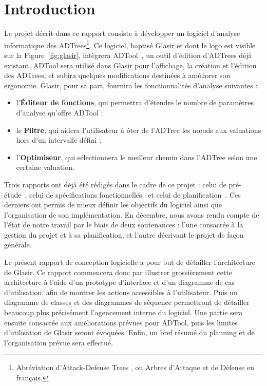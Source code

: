 \section{Introduction}
    \label{sec:intro}

    Le projet décrit dans ce rapport consiste à développer un logiciel d'analyse informatique des ADTrees\footnote{Abréviation d'\og Attack-Defense Trees \fg{}, ou \og Arbres d'Attaque et de Défense\fg{} en français.}. Ce logiciel, baptisé Glasir et dont le logo est visible sur la {\sc Figure}~\ref{fig:glasir}, intègrera ADTool~\cite{ADTool}, un outil d'édition d'ADTrees déjà existant. ADTool sera utilisé dans Glasir pour l'affichage, la création et l'édition des ADTrees, et subira quelques modifications destinées à améliorer son ergonomie. Glasir, pour sa part, fournira les fonctionnalités d'analyse suivantes :

    \begin{itemize}
    	\item l'{\bf Éditeur de fonctions}, qui permettra d'étendre le nombre de paramètres d'analyse qu'offre ADTool ;
    	\item le {\bf Filtre}, qui aidera l'utilisateur à ôter de l'ADTree les nœuds aux valuations hors d'un intervalle défini ;
    	\item l'{\bf Optimiseur}, qui sélectionnera le meilleur chemin dans l'ADTree selon une certaine valuation.
    \end{itemize} 

    Trois rapports ont déjà été rédigés dans le cadre de ce projet : celui de pré-étude~\cite{pre_etude}, celui de spécifications fonctionnelles~\cite{spec_fonc} et celui de planification~\cite{planif}. Ces derniers ont permis de mieux définir les objectifs du logiciel ainsi que l'organisation de son implémentation. En décembre, nous avons rendu compte de l'état de notre travail par le biais de deux soutenances : l'une consacrée à la gestion du projet et à sa planification, et l'autre décrivant le projet de façon générale. 

    Le présent rapport de conception logicielle a pour but de détailler l'architecture de Glasir. Ce rapport commencera donc par illustrer grossièrement cette architecture à l'aide d'un prototype d'interface et d'un diagramme de cas d'utilisation, afin de montrer les actions accessibles à l'utilisateur. Puis un diagramme de classes et des diagrammes de séquence permettront de détailler beaucoup plus précisément l'agencement interne du logiciel. Une partie sera ensuite consacrée aux améliorations prévues pour ADTool, puis les limites d'utilisation de Glasir seront évoquées. Enfin, un bref résumé du planning et de l'organisation prévue sera effectué.

